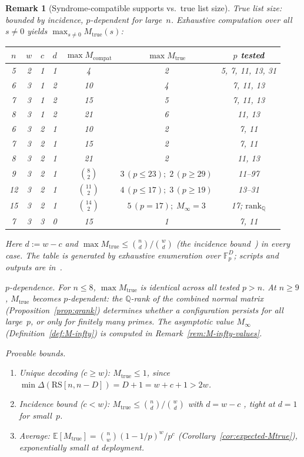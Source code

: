 \documentclass[11pt]{article}
\newtheorem{remark}[theorem]{Remark}
\newcommand{\FF}{\mathbb{F}}
\newcommand{\QQ}{\mathbb{Q}}
\newcommand{\RS}{\mathrm{RS}}
\newcommand{\EE}{\mathbb{E}}
\begin{document}
\begin{remark}[Syndrome-compatible supports vs.\ true list size]
\smallskip\noindent\emph{True list size: bounded by incidence, $p$-dependent for large~$n$.}
Exhaustive computation over all $s \neq 0$ yields $\max_{s \neq 0} M_{\mathrm{true}}(s)$:
\begin{center}\small
\begin{tabular}{ccccccc}
\toprule
$n$ & $w$ & $c$ & $d$ & $\max M_{\mathrm{compat}}$ & $\max M_{\mathrm{true}}$ & $p$ tested \\
\midrule
5 & 2 & 1 & 1 & 4 & 2 & 5, 7, 11, 13, 31 \\
6 & 3 & 1 & 2 & 10 & 4 & 7, 11, 13 \\
7 & 3 & 1 & 2 & 15 & 5 & 7, 11, 13 \\
8 & 3 & 1 & 2 & 21 & 6 & 11, 13 \\
6 & 3 & 2 & 1 & 10 & 2 & 7, 11 \\
7 & 3 & 2 & 1 & 15 & 2 & 7, 11 \\
8 & 3 & 2 & 1 & 21 & 2 & 11, 13 \\
9 & 3 & 2 & 1 & $\binom{8}{2}$ & $3\,(p{\leq}23);\;2\,(p{\geq}29)$ & 11--97 \\
12 & 3 & 2 & 1 & $\binom{11}{2}$ & $4\,(p{\leq}17);\;3\,(p{\geq}19)$ & 13--31 \\
15 & 3 & 2 & 1 & $\binom{14}{2}$ & $5\,(p{=}17);\;M_\infty{=}3$ & 17; $\mathrm{rank}_\QQ$ \\
7 & 3 & 3 & 0 & 15 & 1 & 7, 11 \\
\bottomrule
\end{tabular}
\end{center}
Here $d := w - c$ and $\max M_{\mathrm{true}} \leq \binom{n}{d}/\binom{w}{d}$ (the incidence bound~\cite{Note0088}) in every case. The table is generated by exhaustive enumeration over $\FF_p^D$; scripts and outputs are in~\cite{CompanionRepo}.

\smallskip\noindent\emph{$p$-dependence.} For $n \leq 8$, $\max M_{\mathrm{true}}$ is identical across all tested $p > n$.
At $n \geq 9$, $M_{\mathrm{true}}$ becomes $p$-dependent: the $\QQ$-rank of the combined normal matrix (Proposition~\ref{prop:qrank}) determines whether a configuration persists for all large~$p$, or only for finitely many primes. The asymptotic value $M_\infty$ (Definition~\ref{def:M-infty}) is computed in Remark~\ref{rem:M-infty-values}.

\smallskip\noindent\emph{Provable bounds.}
\begin{enumerate}[nosep,label=(\alph*)]
\item \emph{Unique decoding ($c \geq w$):} $M_{\mathrm{true}} \leq 1$, since $\min\Delta(\RS[n,n{-}D]) = D{+}1 = w{+}c{+}1 > 2w$.
\item \emph{Incidence bound ($c < w$):} $M_{\mathrm{true}} \leq \binom{n}{d}/\binom{w}{d}$ with $d = w - c$ \cite{Note0088}, tight at $d = 1$ for small~$p$.
\item \emph{Average:} $\EE[M_{\mathrm{true}}] = \binom{n}{w}(1 - 1/p)^w/p^c$ (Corollary~\ref{cor:expected-Mtrue}), exponentially small at deployment.
\end{enumerate}


\end{remark}
\end{document}
